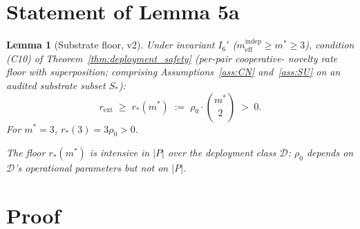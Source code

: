 \documentclass{article}
\newtheorem{lemma}{Lemma}
\newcommand{\rext}{r_{\mathrm{ext}}}
\newcommand{\mindep}{m_{\mathrm{eff}}^{\mathrm{indep}}}
\newcommand{\Saudit}{S_*}
\begin{document}
\section{Statement of Lemma 5a}

\begin{lemma}[Substrate floor, v2]
\label{lem:5a}
Under invariant $I_6'$ ($\mindep \geq m^* \geq 3$), condition
(C10) of Theorem~\ref{thm:deployment_safety} (per-pair cooperative-
novelty rate floor with superposition; comprising
Assumptions~\ref{ass:CN} and~\ref{ass:SU} on an audited substrate
subset $\Saudit$):
\[
  \rext \;\geq\; r_*(m^*) \;:=\; \rho_0 \cdot \binom{m^*}{2} \;>\; 0.
\]
For $m^* = 3$, $r_*(3) = 3\rho_0 > 0$.

The floor $r_*(m^*)$ is intensive in $|P|$ over the deployment
class $\mathcal{D}$: $\rho_0$ depends on $\mathcal{D}$'s operational
parameters but not on $|P|$.
\end{lemma}

\section{Proof}
\end{document}
